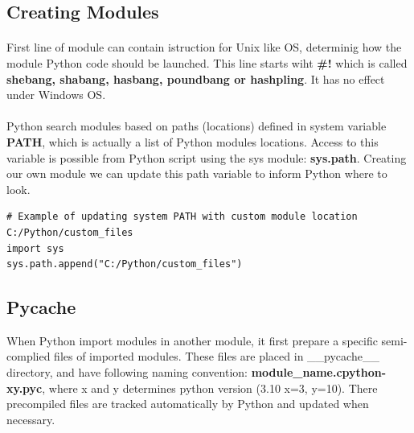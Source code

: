 \documentclass{article}
\begin{document}
\subsection{Creating Modules}
\paragraph{}
First line of module can contain istruction for Unix like OS, determinig how the module Python code should be launched. This line starts wiht \textbf{\#!} which is called \textbf{shebang, shabang, hasbang, poundbang or hashpling}. It has no effect under Windows OS.
\paragraph{}
Python search modules based on paths (locations) defined in system variable \textbf{PATH}, which is actually a list of Python modules locations. Access to this variable is possible from Python script using the sys module: \textbf{sys.path}. Creating our own module we can update this path variable to inform Python where to look.
\begin{lstlisting}[style=pystyle]
# Example of updating system PATH with custom module location C:/Python/custom_files
import sys
sys.path.append("C:/Python/custom_files") 
\end{lstlisting}


\subsection{Pycache}
When Python import modules in another module, it first prepare a specific semi-complied files of imported modules. These files are placed in \_\_pycache\_\_ directory, and have following naming convention: \textbf{module\_name.cpython-xy.pyc}, where x and y determines python version (3.10 x=3, y=10). There precompiled files are tracked automatically by Python and updated when necessary.  
\end{document}
